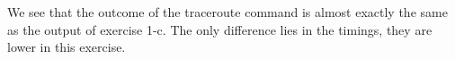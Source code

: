 We see that the outcome of the traceroute command is almost exactly the same as the output of exercise 1-c.
The only difference lies in the timings, they are lower in this exercise.
